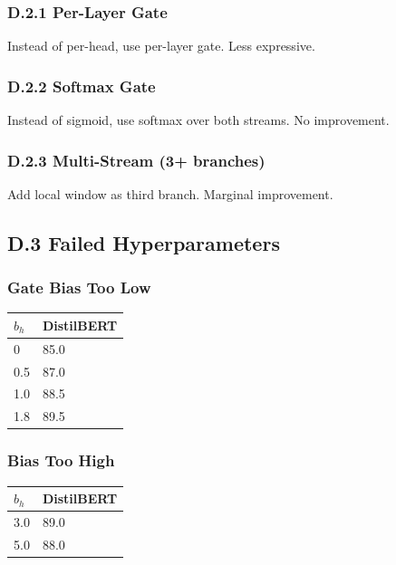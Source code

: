 \subsubsection{D.2.1 Per-Layer Gate}

Instead of per-head, use per-layer gate. Less expressive.

\subsubsection{D.2.2 Softmax Gate}

Instead of sigmoid, use softmax over both streams. No improvement.

\subsubsection{D.2.3 Multi-Stream (3+ branches)}

Add local window as third branch. Marginal improvement.

\subsection{D.3 Failed Hyperparameters}

\subsubsection{Gate Bias Too Low}
\begin{table}[H]
\centering
\small
\begin{tabular}{ll}
\toprule
\textbf{$b_h$} & \textbf{DistilBERT} \\
\midrule
0 & 85.0 \\
0.5 & 87.0 \\
1.0 & 88.5 \\
1.8 & 89.5 \\
\bottomrule
\end{tabular}
\end{table}

\subsubsection{Bias Too High}
\begin{table}[H]
\centering
\small
\begin{tabular}{ll}
\toprule
\textbf{$b_h$} & \textbf{DistilBERT} \\
\midrule
3.0 & 89.0 \\
5.0 & 88.0 \\
\bottomrule
\end{tabular}
\end{table}

